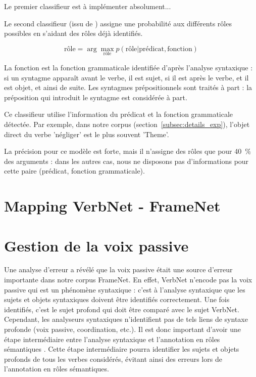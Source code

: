 
Le premier classifieur est à implémenter absolument...

Le second classifieur (issu de \cite{swier2004unsupervised}) assigne une
probabilité aux différents rôles possibles en s'aidant des rôles déjà
identifiés.

$$ \text{rôle} = \arg\max_{\text{rôle}} p(\text{rôle} \vert \text{prédicat}, \text{fonction})$$

La fonction est la fonction grammaticale identifiée d'après l'analyse
syntaxique : si un syntagme apparaît avant le verbe, il est sujet, si il est
après le verbe, et il est objet, et ainsi de suite. Les syntagmes
prépositionnels sont traités à part : la préposition qui introduit le syntagme
est considérée à part.

Ce classifieur utilise l'information du prédicat et la fonction grammaticale
détectée. Par exemple, dans notre corpus (section~\ref{subsec:details_exp}),
l'objet direct du verbe 'négliger' est le plus souvent 'Theme'.

La précision pour ce modèle est forte, mais il n'assigne des rôles que pour
40~\% des arguments : dans les autres cas, nous ne disposons pas d'informations
pour cette paire (prédicat, fonction grammaticale).

\section{Mapping VerbNet - FrameNet}

\section{Gestion de la voix passive}
\label{sec:passif}

Une analyse d'erreur a révélé que la voix passive était une source d'erreur
importante dans notre corpus FrameNet. En effet, VerbNet n'encode pas la voix
passive qui est un phénomène syntaxique : c'est à l'analyse syntaxique que les
sujets et objets syntaxiques doivent être identifiés correctement. Une fois
identifiés, c'est le sujet profond qui doit être comparé avec le sujet VerbNet.
Cependant, les analyseurs syntaxiques n'identifient pas de tels liens de
syntaxe profonde (voix passive, coordination, etc.). Il est donc important
d'avoir une étape intermédiaire entre l'analyse syntaxique et l'annotation en
rôles sémantiques \citep{bonfante2011modular, ribeyre2013systeme}. Cette étape
intermédiaire pourra identifier les sujets et objets profonds de tous les
verbes considérés, évitant ainsi des erreurs lors de l'annotation en rôles
sémantiques. 

